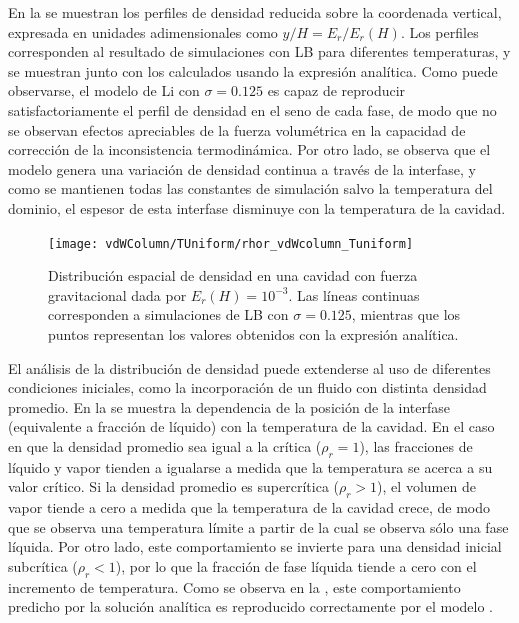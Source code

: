 En la  se muestran los perfiles de densidad reducida sobre la coordenada vertical, expresada en unidades adimensionales como $y/H = E_r/E_r(H)$. Los perfiles corresponden al resultado de simulaciones con LB para diferentes temperaturas, y se muestran junto con los calculados usando la expresi\'on anal\'itica. Como puede observarse, el modelo \pp{} de Li con $\sigma=0.125$ es capaz de reproducir satisfactoriamente el perfil de densidad en el seno de cada fase, de modo que no se observan efectos apreciables de la fuerza volum\'etrica en la capacidad de correcci\'on de la inconsistencia termodin\'amica. Por otro lado, se observa que el modelo genera una variaci\'on de densidad continua a trav\'es de la interfase, y como se mantienen todas las constantes de simulaci\'on salvo la temperatura del dominio, el espesor de esta interfase disminuye con la temperatura de la cavidad.

\begin{figure}[ht]
	\centering
	\texttt{[image: vdWColumn/TUniform/rhor\_vdWcolumn\_Tuniform]}
	\caption{Distribuci\'on espacial de densidad en una cavidad con fuerza gravitacional dada por $E_r(H)=10^{-3}$. Las l\'ineas continuas corresponden a simulaciones de LB con $\sigma=0.125$, mientras que los puntos representan los valores obtenidos con la expresi\'on anal\'itica.}
	\label{fig:vdWColumn_rhor_tuniform}
\end{figure}

El an\'alisis de la distribuci\'on de densidad puede extenderse al uso de diferentes condiciones iniciales, como la incorporaci\'on de un fluido con distinta densidad promedio. En la  se muestra la dependencia de la posici\'on de la interfase (equivalente a fracci\'on de l\'iquido) con la temperatura de la cavidad. En el caso en que la densidad promedio sea igual a la cr\'itica ($\rho_r=1$), las fracciones de l\'iquido y vapor tienden a igualarse a medida que la temperatura se acerca a su valor cr\'itico. Si la densidad promedio es supercr\'itica ($\rho_r > 1$), el volumen de vapor tiende a cero a medida que la temperatura de la cavidad crece, de modo que se observa una temperatura l\'imite a partir de la cual se observa s\'olo una fase l\'iquida. Por otro lado, este comportamiento se invierte para una densidad inicial subcr\'itica ($\rho_r < 1$), por lo que la fracci\'on de fase l\'iquida tiende a cero con el incremento de temperatura. Como se observa en la , este comportamiento predicho por la soluci\'on anal\'itica es reproducido correctamente por el modelo \pp{}.

